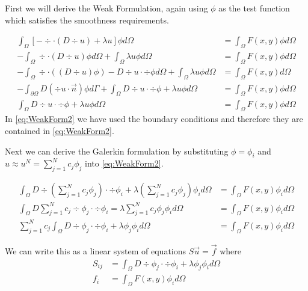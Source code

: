 \documentclass[10pt,a4paper]{article}
\begin{document}
First we will derive the Weak Formulation, again using $\phi$ as the test function which satisfies the smoothness requirements. 

\begin{equation}
\label{eq:WeakForm2}
\begin{split}
\int_\Omega \left[ -\div \cdot \left( D \div u \right) + \lambda u \right] \phi d\Omega &= \int_\Omega F(x,y) \phi d\Omega \\
- \int_\Omega \div \cdot \left( D \div u \right) \phi d\Omega + \int_\Omega \lambda u \phi d\Omega &= \int_\Omega F(x,y) \phi d\Omega \\
-\int_\Omega \div \cdot \left( \left( D \div u \right) \phi \right) - D \div u \cdot \div \phi d\Omega + \int_\Omega \lambda u \phi d\Omega &= \int_\Omega F(x,y) d\Omega \\
-\int_{\partial \Omega} D \left( \div u \cdot \vec{n} \right) \phi d\Gamma + \int_\Omega D \div u \cdot \div \phi + \lambda u \phi d\Omega &= \int_\Omega F(x,y) \phi d\Omega \\
\int_\Omega D \div u \cdot \div \phi + \lambda u \phi d\Omega &= \int_\Omega F(x,y) \phi d\Omega
\end{split}
\end{equation}
In \cref{eq:WeakForm2} we have used the boundary conditions and therefore they are contained in \cref{eq:WeakForm2}.

Next we can derive the Galerkin formulation by substituting $\phi = \phi_i$ and $u \approx u^N = \sum_{j=1}^N c_j \phi_j$ into \cref{eq:WeakForm2}.

\begin{equation}
\label{eq:Galerkin2}
\begin{split}
\int_\Omega D \div \left( \sum_{j=1}^N c_j \phi_j \right) \cdot \div \phi_i + \lambda \left( \sum_{j=1}^N c_j \phi_j \right) \phi_i d\Omega &= \int_\Omega F(x,y) \phi_i d\Omega \\
\int_\Omega D \sum_{j=1}^N c_j \div \phi_j \cdot \div \phi_i = \lambda \sum_{j=1}^N c_j \phi_j \phi_i d\Omega &= \int_\Omega F(x,y) \phi_i d\Omega \\
\sum_{j=1}^N c_j \int_\Omega D \div \phi_j \cdot \div \phi_i + \lambda \phi_j \phi_i d\Omega &= \int_\Omega F(x,y) \phi_i d\Omega
\end{split}
\end{equation}

We can write this as a linear system of equations $S \vec{u} = \vec{f}$ where
\begin{equation}
\begin{split}
S_{ij} &= \int_\Omega D \div \phi_j \cdot \div \phi_i + \lambda \phi_j \phi_i d\Omega \\
f_i &= \int_\Omega F(x,y) \phi_i d\Omega
\end{split}
\end{equation}
\end{document}
